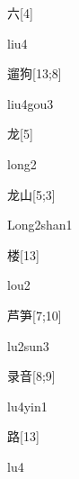 \begin{verbete}[liu4]{六}[4]
\begin{pronuncia}{liu4}
\end{pronuncia}
\end{verbete}

\begin{verbete}{遛狗}[13;8]
\begin{pronuncia}{liu4gou3}
\end{pronuncia}
\end{verbete}

\begin{verbete}[long2]{龙}[5]
\begin{pronuncia}{long2}
\end{pronuncia}
\end{verbete}

\begin{verbete}{龙山}[5;3]
\begin{pronuncia}{Long2shan1}
\end{pronuncia}
\end{verbete}

\begin{verbete}[lou2]{楼}[13]
\begin{pronuncia}{lou2}
\end{pronuncia}
\end{verbete}

\begin{verbete}[lu2sun3]{芦笋}[7;10]
\begin{pronuncia}{lu2sun3}
\end{pronuncia}
\end{verbete}

\begin{verbete}[lu4yin1]{录音}[8;9]
\begin{pronuncia}{lu4yin1}
\end{pronuncia}
\end{verbete}

\begin{verbete}[lu4]{路}[13]
\begin{pronuncia}{lu4}
\end{pronuncia}
\end{verbete}

